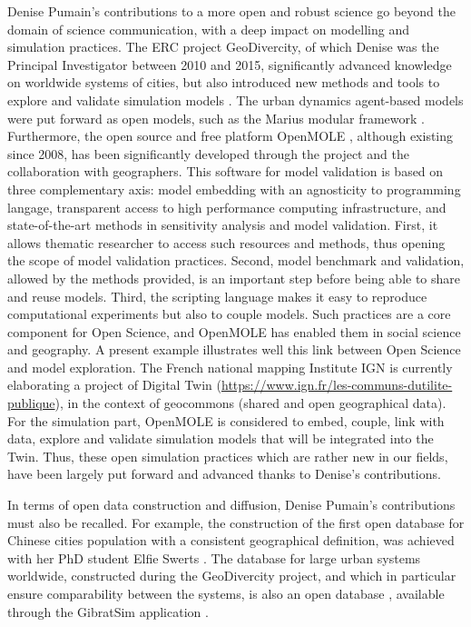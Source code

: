 \documentclass[11pt]{article}
\begin{document}
Denise Pumain’s contributions to a more open and robust science go beyond the domain of science communication, with a deep impact on modelling and simulation practices. The ERC project GeoDivercity, of which Denise was the Principal Investigator between 2010 and 2015, significantly advanced knowledge on worldwide systems of cities, but also introduced new methods and tools to explore and validate simulation models \citep{pumain2017urban,pumain2020theories}. The urban dynamics agent-based models were put forward as open models, such as the Marius modular framework \cite{cottineau2015modular}. Furthermore, the open source and free platform OpenMOLE \citep{reuillon2013openmole}, although existing since 2008, has been significantly developed through the project and the collaboration with geographers. This software for model validation is based on three complementary axis: model embedding with an agnosticity to programming langage, transparent access to high performance computing infrastructure, and state-of-the-art methods in sensitivity analysis and model validation. First, it allows thematic researcher to access such resources and methods, thus opening the scope of model validation practices. Second, model benchmark and validation, allowed by the methods provided, is an important step before being able to share and reuse models. Third, the scripting language makes it easy to reproduce computational experiments but also to couple models. Such practices are a core component for Open Science, and OpenMOLE has enabled them in social science and geography. A present example illustrates well this link between Open Science and model exploration. The French national mapping Institute IGN is currently elaborating a project of Digital Twin (\url{https://www.ign.fr/les-communs-dutilite-publique}), in the context of geocommons (shared and open geographical data). For the simulation part, OpenMOLE is considered to embed, couple, link with data, explore and validate simulation models that will be integrated into the Twin. Thus, these open simulation practices which are rather new in our fields, have been largely put forward and advanced thanks to Denise’s contributions.



In terms of open data construction and diffusion, Denise Pumain’s contributions must also be recalled. For example, the construction of the first open database for Chinese cities population with a consistent geographical definition, was achieved with her PhD student Elfie Swerts \citep{swerts2010peut,swerts2017data}. The database for large urban systems worldwide, constructed during the GeoDivercity project, and which in particular ensure comparability between the systems, is also an open database \citep{pumain2015multilevel,cura2017old}, available through the GibratSim application \citep{cura2017gibratsim}.
\end{document}
